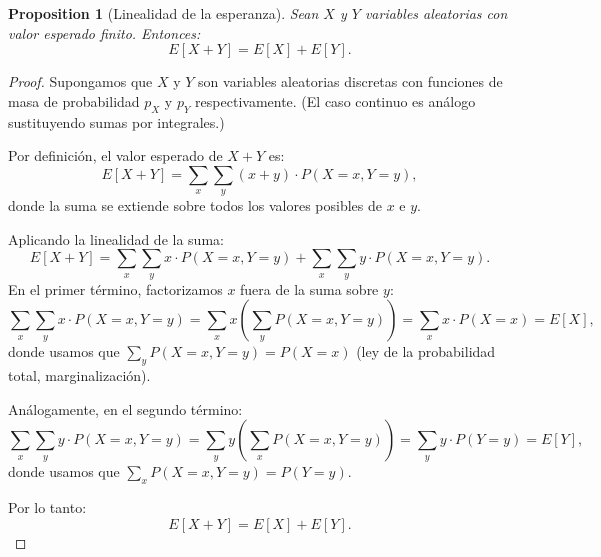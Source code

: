 \documentclass[11pt,a4paper]{article}
\theoremstyle{plain}
\newtheorem{proposition}[theorem]{Proposition}
\theoremstyle{definition}
\begin{document}
\begin{proposition}[Linealidad de la esperanza]
Sean $X$ y $Y$ variables aleatorias con valor esperado finito. Entonces:
\[
E[X + Y] = E[X] + E[Y].
\]
\end{proposition}

\begin{proof}
Supongamos que $X$ y $Y$ son variables aleatorias discretas con funciones de masa de probabilidad $p_X$ y $p_Y$ respectivamente. (El caso continuo es análogo sustituyendo sumas por integrales.)

Por definición, el valor esperado de $X + Y$ es:
\[
E[X + Y] = \sum_{x} \sum_{y} (x + y) \cdot P(X = x, Y = y),
\]
donde la suma se extiende sobre todos los valores posibles de $x$ e $y$.

Aplicando la linealidad de la suma:
\[
E[X + Y] = \sum_{x} \sum_{y} x \cdot P(X = x, Y = y) + \sum_{x} \sum_{y} y \cdot P(X = x, Y = y).
\]
En el primer término, factorizamos $x$ fuera de la suma sobre $y$:
\[
\sum_{x} \sum_{y} x \cdot P(X = x, Y = y) = \sum_{x} x \left( \sum_{y} P(X = x, Y = y) \right) = \sum_{x} x \cdot P(X = x) = E[X],
\]
donde usamos que $\sum_{y} P(X = x, Y = y) = P(X = x)$ (ley de la probabilidad total, marginalización).

Análogamente, en el segundo término:
\[
\sum_{x} \sum_{y} y \cdot P(X = x, Y = y) = \sum_{y} y \left( \sum_{x} P(X = x, Y = y) \right) = \sum_{y} y \cdot P(Y = y) = E[Y],
\]
donde usamos que $\sum_{x} P(X = x, Y = y) = P(Y = y)$.

Por lo tanto:
\[
E[X + Y] = E[X] + E[Y].
\]
\end{proof}
\end{document}
